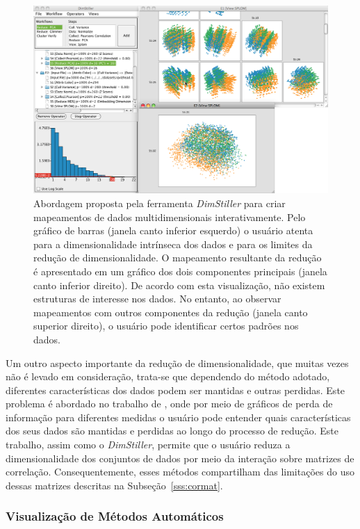 \begin{figure}[h!]
    \centering
    \includegraphics[width=16cm]{images/ds.png}
    \caption[DimStiller]{Abordagem proposta pela ferramenta
    \emph{DimStiller} para criar mapeamentos de dados
multidimensionais interativamente. Pelo gráfico de barras
(janela canto inferior esquerdo) o usuário atenta para a
dimensionalidade intrínseca dos dados e para os limites da
redução de dimensionalidade. O mapeamento resultante da
redução é apresentado em um gráfico dos dois componentes
principais (janela canto inferior direito). De acordo com
esta visualização, não existem estruturas de interesse nos
dados. No entanto, ao observar mapeamentos com outros
componentes da redução (janela canto superior direito), o
usuário pode identificar certos padrões nos dados.}
    \label{fig:ds}
\end{figure}

Um outro aspecto importante da redução de dimensionalidade,
que muitas vezes não é levado em consideração, trata-se que
dependendo do método adotado, diferentes características dos
dados podem ser mantidas e outras perdidas. Este problema é
abordado no trabalho de \cite{Johansson2009}, onde por meio
de gráficos de perda de informação para diferentes medidas o
usuário pode entender quais características dos seus dados
são mantidas e perdidas ao longo do processo de redução.
Este trabalho, assim como o \emph{DimStiller}, permite que o
usuário reduza a dimensionalidade dos conjuntos de dados por
meio da interação sobre matrizes de correlação.
Consequentemente, esses métodos compartilham das limitações
do uso dessas matrizes descritas na
Subseção~\ref{sss:cormat}.

\subsubsection{Visualização de Métodos Automáticos}


